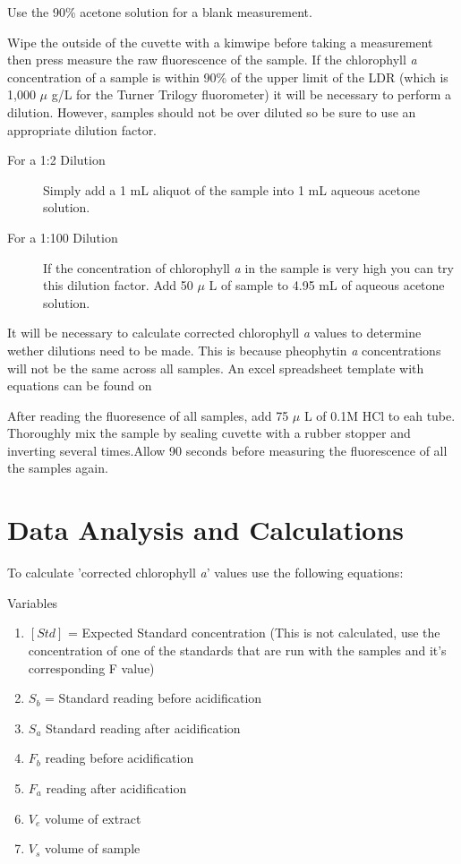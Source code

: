 \documentclass[12pt]{../SOP3}\usepackage[]{graphicx}\usepackage[]{color}
\begin{document}
\NP Use the 90\% acetone solution for a blank measurement.


\NP Wipe the outside of the cuvette with a kimwipe before taking a measurement then press measure the raw fluorescence of the sample. If the chlorophyll \textit{a} concentration of a sample is within 90\% of the upper limit of the LDR (which is 1,000 $\mu$ g/L for the Turner Trilogy fluorometer) it will be necessary to perform a dilution. However, samples should not be over diluted so be sure to use an appropriate dilution factor. 

\begin{description} 
\item[For a 1:2 Dilution] Simply add a 1 mL aliquot of the sample into 1 mL aqueous acetone solution.
\item[For a 1:100 Dilution] If the concentration of chlorophyll \textit{a} in the sample is very high you can try this dilution factor. Add 50 $\mu$ L of sample to 4.95 mL of aqueous acetone solution. 
\end{description}

\NP It will be necessary to calculate corrected chlorophyll \textit{a} values to determine wether dilutions need to be made. This is because pheophytin \textit{a} concentrations will not be the same across all samples. An excel spreadsheet template with equations can be found on %

\NP After reading the fluoresence of all samples, add 75 $\mu$ L of  0.1M HCl to eah tube. Thoroughly mix the sample by sealing cuvette with a rubber stopper and inverting several times.Allow 90 seconds before measuring the fluorescence of all the samples again. 

\section{Data Analysis and Calculations}
To calculate 'corrected chlorophyll \textit{a}' values use the following equations: %

\NP Variables
\begin{enumerate}
\item $[Std]$ = Expected Standard concentration (This is not calculated, use the concentration of one of the standards that are run with the samples and it's corresponding F value)
\item $S_b$ = Standard reading before acidification
\item $S_a$ Standard reading after acidification
\item $F_b$ reading before acidification
\item $F_a$ reading after acidification
\item $V_e$ volume of extract
\item $V_s$ volume of sample 
\end{enumerate}
\end{document}
